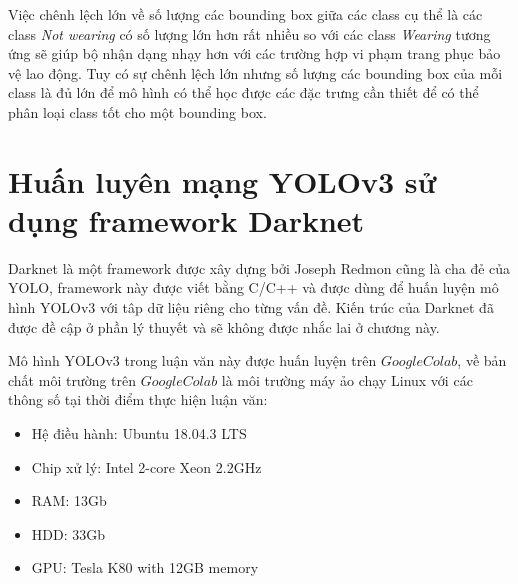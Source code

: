 Việc chênh lệch lớn về số lượng các bounding box giữa các class cụ thể là các class \emph{Not wearing} có số lượng lớn hơn rất nhiều so với các class \emph{Wearing} tương ứng sẽ giúp bộ nhận dạng nhạy hơn với các trường hợp vi phạm trang phục bảo vệ lao động. Tuy có sự chênh lệch lớn nhưng số lượng các bounding box của mỗi class là đủ lớn để mô hình có thể học được các đặc trưng cần thiết để có thể phân loại class tốt cho một bounding box.

\section{Huấn luyên mạng YOLOv3 sử dụng framework Darknet\cite{ref:10}}
Darknet là một framework được xây dựng bởi Joseph Redmon cũng là cha đẻ của YOLO, framework này được viết bằng C/C++ và được dùng để huấn luyện mô hình YOLOv3 với tâp dữ liệu riêng cho từng vấn đề. Kiến trúc của Darknet đã được đề cập ở phần lý thuyết và sẽ không được nhắc lai ở chương này.

Mô hình YOLOv3 trong luận văn này được huấn luyện trên $Google Colab$, về bản chất môi trường trên $Google Colab$ là môi trường máy ảo chạy Linux với các thông số tại thời điểm thực hiện luận văn: 
\begin{itemize}
	\item Hệ điều hành: Ubuntu 18.04.3 LTS
	\item Chip xử lý: Intel 2-core Xeon 2.2GHz
	\item RAM: 13Gb
	\item HDD: 33Gb
	\item GPU: Tesla K80 with 12GB memory
\end{itemize}

